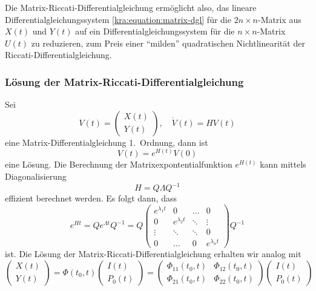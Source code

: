 Die Matrix-Riccati-Differentialgleichung ermöglicht also, das
lineare Differentialgleichungssystem \eqref{kra:equation:matrix-dgl}
für die $2n\times n$-Matrix aus
$X(t)$ und $Y(t)$ auf ein Differentialgleichungssystem für die
$n\times n$-Matrix $U(t)$ zu reduzieren, zum Preis einer ``milden''
quadratischen Nichtlinearität der Riccati-Differentialgleichung.

\subsubsection{Lösung der Matrix-Riccati-Differentialgleichung}
Sei
\[
    V(t)
    =
    \begin{pmatrix}
        X(t) \\
        Y(t)
    \end{pmatrix},
    \quad
    \dot{V}(t) = HV(t)
\]
eine Matrix-Differentialgleichung 1.~Ordnung, dann ist
\[
    V(t) = e^{H(t)} V(0)
\]
eine Lösung.
Die Berechnung der Matrixexpontentialfunktion $e^{H(t)}$ kann mittels
%
Diagonalisierung
%
\[
    H = Q \Lambda Q^{-1}
\]
effizient berechnet werden.
Es folgt dann, dass
\[
    e^{Ht}
    =
    Q
    e^{\Lambda t}
    Q^{-1}
    =
    Q
    \begin{pmatrix}
        e^{\lambda_1 t} & 0               & \dots  & 0               \\
        0               & e^{\lambda_2 t} & \ddots & \vdots          \\
        \vdots          & \ddots          & \ddots & 0               \\[3pt]
        0               & \dots           & 0      & e^{\lambda_n t}
    \end{pmatrix}
    Q^{-1}
\]
ist.
Die Lösung der Matrix-Riccati-Differentialgleichung erhalten wir analog mit
\begin{equation}
    \label{kra:matrixriccati-solution}
    \begin{pmatrix}
        X(t) \\
        Y(t)
    \end{pmatrix}
    =
    \Phi(t_0, t)
    \begin{pmatrix}
        I(t) \\
        P_0(t)
    \end{pmatrix}
    =
    \begin{pmatrix}
        \Phi_{11}(t_0, t) & \Phi_{12}(t_0, t) \\
        \Phi_{21}(t_0, t) & \Phi_{22}(t_0, t)
    \end{pmatrix}
    \begin{pmatrix}
        I(t) \\
        P_0(t)
    \end{pmatrix}
\end{equation}
